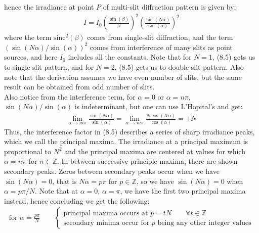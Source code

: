 \documentclass[11pt]{book}
\theoremstyle{break}
\theoremstyle{break}
\newcommand{\Z}{\mathbb{Z}}
\begin{document}
hence the irradiance at point $P$ of multi-slit diffraction pattern is given by:
\begin{align}
I = I_0 \left( \frac{\sin(\beta)}{\beta}\right)^2 \left( \frac{\sin(N\alpha)}{\sin(\alpha)}\right)^2
\end{align}
where the term $\text{sinc}^2(\beta)$ comes from single-slit diffraction, and the term $(\sin(N\alpha)/\sin(\alpha))^2$ comes from interference of many slits as point sources, and here $I_0$ includes all the constants. Note that for $N=1$, (8.5) gets us to single-slit pattern, and for $N=2$, (8.5) gets us to double-slit pattern. Also note that the derivation assumes we have even number of slits, but the same result can be obtained from odd number of slits.\\


Also notice from the interference term, for $\alpha = 0$ or $\alpha = n\pi$, $\sin(N\alpha)/\sin(\alpha)$ is indeterminant, but one can use L'Hopital's and get:
\begin{align*}
\lim_{\alpha \to m\pi}\frac{\sin(N\alpha)}{\sin(\alpha)} = \lim_{\alpha \to m\pi}\frac{N \cos(N\alpha)}{\cos(\alpha)} = \pm N
\end{align*}
Thus, the interference factor in (8.5) describes a series of sharp irradiance peaks, which we call the principal maxima. The irradiance at a principal maximum is proportional to $N^2$ and the principal maxima are centered at values for which $\alpha = n\pi$ for $n \in \Z$. In between successive principle maxima, there are shown secondary peaks. Zeros between secondary peaks occur when we have $\sin(N\alpha) = 0$, that is $N\alpha = p\pi$ for $p \in \Z$, so we have $\sin(N\alpha) = 0$ when $\alpha = p\pi/N$. Note that at $\alpha = 0$, $\alpha = \pi$, we have the first two principal maxima instead, hence concluding we get the following:
\begin{align*}
\text{for }\alpha = \frac{p\pi}{N}\qquad \begin{cases}
\text{principal maxima occurs at }p=tN \qquad\forall t \in \Z\\
\text{secondary minima occur for }p\text{ being any other integer values}
\end{cases}
\end{align*}
\end{document}
